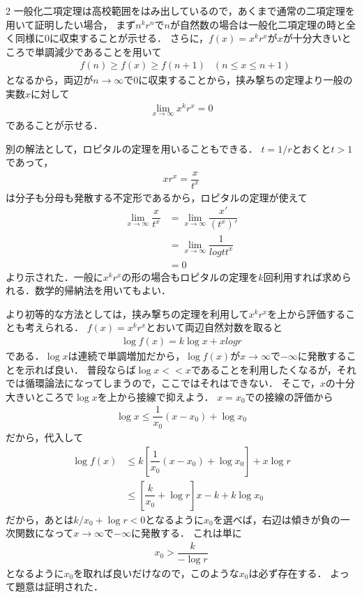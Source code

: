 \documentclass[../../main.tex]{subfiles}
\begin{document}
\begin{multicols}{2}
  一般化二項定理は高校範囲をはみ出しているので，あくまで通常の二項定理を用いて証明したい場合，
  まず$n^{k}r^{n}$で$n$が自然数の場合は一般化二項定理の時と全く同様に$0$に収束することが示せる．
  さらに，$f(x)=x^{k}r^x$が$x$が十分大きいところで単調減少であることを用いて
  \begin{align}
    & f(n) \ge f(x) \ge f(n+1) & (n\le x \le n+1)
  \end{align}
  となるから，両辺が$n\to\infty$で$0$に収束することから，挟み撃ちの定理より一般の実数$x$に対して
  \begin{align}
    \lim_{x\to\infty} x^{k}r^{x} = 0
  \end{align}
  であることが示せる．

  別の解法として，ロピタルの定理を用いることもできる．
  $t=1/r$とおくと$t>1$であって，
  \begin{align}
    xr^{x} = \dfrac{x}{t^{x}}
  \end{align}
  は分子も分母も発散する不定形であるから，ロピタルの定理が使えて
  \begin{align}
    \lim_{x\to\infty}\dfrac{x}{t^{x}}
    & = \lim_{x\to\infty}\dfrac{x'}{(t^{x})'}   \\
    & = \lim_{x\to\infty}\dfrac{1}{log t t^{x}} \\
    & = 0
  \end{align}
  より示された．一般に$x^{k}r^{x}$の形の場合もロピタルの定理を$k$回利用すれば求められる．数学的帰納法を用いてもよい．

  より初等的な方法としては，挟み撃ちの定理を利用して$x^{k}r^{x}$を上から評価することも考えられる．
  $f(x) = x^{k}r^{x}$とおいて両辺自然対数を取ると
  \begin{align}
    \log f(x) = k\log x + x log r
  \end{align}
  である．$\log x$は連続で単調増加だから，$\log f(x)$が$x\to\infty$で$-\infty$に発散することを示れば良い．
  普段ならば$\log x << x$であることを利用したくなるが，それでは循環論法になってしまうので，ここではそれはできない．
  そこで，$x$の十分大きいところで$\log x$を上から接線で抑えよう．
  $x=x_0$での接線の評価から
  \begin{align}
    \log x \le \dfrac{1}{x_0}\left(x-x_0\right) + \log x_0
  \end{align}
  だから，代入して
  \begin{align}
    \log f(x)
    & \le k\left[\dfrac{1}{x_0}\left(x-x_0\right) + \log x_0 \right] + x \log r \\
    & \le \left[\dfrac{k}{x_0}+ \log r\right] x - k + k\log x_0
  \end{align}
  だから，あとは$k/x_0 + \log r < 0$となるように$x_0$を選べば，右辺は傾きが負の一次関数になって$x\to\infty$で$-\infty$に発散する．
  これは単に
  \begin{align}
    x_0 > \dfrac{k}{- \log r}
  \end{align}
  となるように$x_0$を取れば良いだけなので，このような$x_0$は必ず存在する．
  よって題意は証明された．


\end{multicols}
\end{document}
